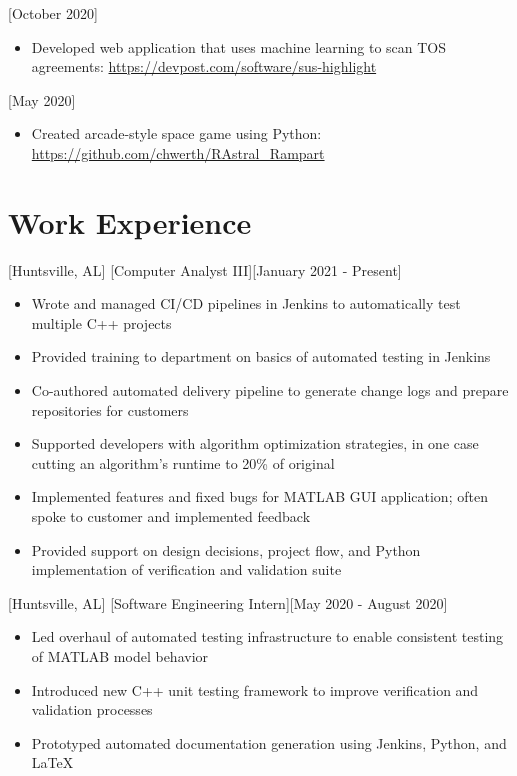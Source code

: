 \documentclass[hidelinks, 11pt]{article}
\newcommand{\link}[1]{{\color{blue}\href{#1}{#1}}}
\begin{document}
[October 2020]

\begin{itemize}
  \item Developed web application that uses machine learning to scan TOS agreements: \link{https://devpost.com/software/sus-highlight}
\end{itemize}

[May 2020]

\begin{itemize}
  \item Created arcade-style space game using Python: \link{https://github.com/chwerth/RAstral\_Rampart}
\end{itemize}

\section{Work Experience}

[Huntsville, AL]
[Computer Analyst III][January 2021 - Present]

\begin{itemize}
  \item Wrote and managed CI/CD pipelines in Jenkins to automatically test multiple C++ projects
  \item Provided training to department on basics of automated testing in Jenkins
  \item Co-authored automated delivery pipeline to generate change logs and prepare repositories for customers
  \item Supported developers with algorithm optimization strategies, in one case cutting an algorithm's runtime to 20\% of original
  \item Implemented features and fixed bugs for MATLAB GUI application; often spoke to customer and implemented feedback
  \item Provided support on design decisions, project flow, and Python implementation of verification and validation suite
\end{itemize}

[Huntsville, AL]
[Software Engineering Intern][May 2020 - August 2020]

\begin{itemize}
  \item Led overhaul of automated testing infrastructure to enable consistent testing of MATLAB model behavior
  \item Introduced new C++ unit testing framework to improve verification and validation processes
  \item Prototyped automated documentation generation using Jenkins, Python, and LaTeX
\end{itemize}
\end{document}

